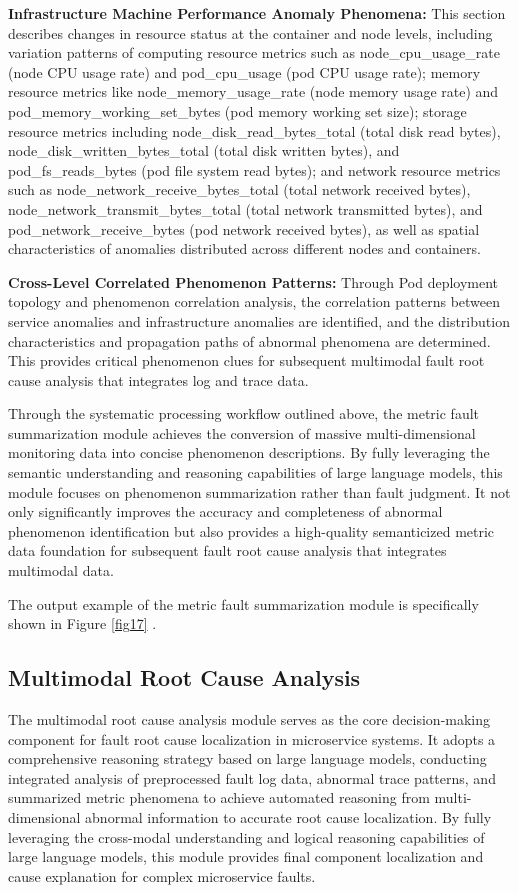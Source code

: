 \documentclass[10pt]{article}
\let\oldref\ref
\renewcommand{\ref}[1]{%
    \textcolor{blue}{\oldref{#1}}%
}
\begin{document}
\textbf{Infrastructure Machine Performance Anomaly Phenomena:} This section describes changes in resource status at the container and node levels, including variation patterns of computing resource metrics such as node\_cpu\_usage\_rate (node CPU usage rate) and pod\_cpu\_usage (pod CPU usage rate); memory resource metrics like node\_memory\_usage\_rate (node memory usage rate) and pod\_memory\_working\_set\_bytes (pod memory working set size); storage resource metrics including node\_disk\_read\_bytes\_total (total disk read bytes), node\_disk\_written\_bytes\_total (total disk written bytes), and pod\_fs\_reads\_bytes (pod file system read bytes); and network resource metrics such as node\_network\_receive\_bytes\_total (total network received bytes), node\_network\_transmit\_bytes\_total (total network transmitted bytes), and pod\_network\_receive\_bytes (pod network received bytes), as well as spatial characteristics of anomalies distributed across different nodes and containers.

\textbf{Cross-Level Correlated Phenomenon Patterns:} Through Pod deployment topology and phenomenon correlation analysis, the correlation patterns between service anomalies and infrastructure anomalies are identified, and the distribution characteristics and propagation paths of abnormal phenomena are determined. This provides critical phenomenon clues for subsequent multimodal fault root cause analysis that integrates log and trace data.

Through the systematic processing workflow outlined above, the metric fault summarization module achieves the conversion of massive multi-dimensional monitoring data into concise phenomenon descriptions. By fully leveraging the semantic understanding and reasoning capabilities of large language models, this module focuses on phenomenon summarization rather than fault judgment. It not only significantly improves the accuracy and completeness of abnormal phenomenon identification but also provides a high-quality semanticized metric data foundation for subsequent fault root cause analysis that integrates multimodal data.

The output example of the metric fault summarization module is specifically shown in Figure \ref{fig17}.

\subsection{Multimodal Root Cause Analysis}

The multimodal root cause analysis module serves as the core decision-making component for fault root cause localization in microservice systems. It adopts a comprehensive reasoning strategy based on large language models, conducting integrated analysis of preprocessed fault log data, abnormal trace patterns, and summarized metric phenomena to achieve automated reasoning from multi-dimensional abnormal information to accurate root cause localization. By fully leveraging the cross-modal understanding and logical reasoning capabilities of large language models, this module provides final component localization and cause explanation for complex microservice faults.
\end{document}
